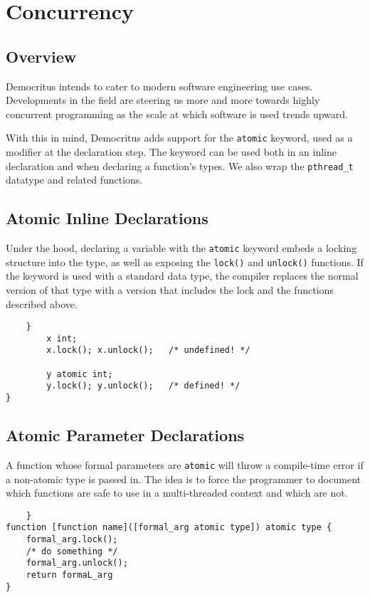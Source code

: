 \chapter{Concurrency}
	\section{Overview}
		Democritus intends to cater to modern software engineering use cases. Developments in the field are steering us more and more towards highly concurrent programming as the scale at which software is used trends upward.

		\vspace{5mm}
		\noindent
		With this in mind, Democritus adds support for the \texttt{atomic} keyword, used as a modifier at the declaration step. The keyword can be used both in an inline declaration and when declaring a function's types. We also wrap the \texttt{pthread_t} datatype and related functions.

	\section{Atomic Inline Declarations}
		Under the hood, declaring a variable with the \texttt{atomic} keyword embeds a locking structure into the type, as well as exposing the \texttt{lock()} and \texttt{unlock()} functions. If the keyword is used with a standard data type, the compiler replaces the normal version of that type with a version that includes the lock and the functions described above.

		\begin{lstlisting}
	}
		x int;
		x.lock(); x.unlock();	/* undefined! */

		y atomic int;
		y.lock(); y.unlock();	/* defined! */
}
		\end{lstlisting}

	\section{Atomic Parameter Declarations}
		A function whose formal parameters are \texttt{atomic} will throw a compile-time error if a non-atomic type is passed in. The idea is to force the programmer to document which functions are safe to use in a multi-threaded context and which are not.

		\begin{lstlisting}
	}
function [function name]([formal_arg atomic type]) atomic type {
	formal_arg.lock();
	/* do something */
	formal_arg.unlock();
	return formaL_arg
}
		\end{lstlisting}

